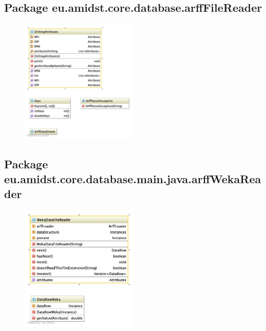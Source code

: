\subsection{Package eu.amidst.core.database.arffFileReader}

\begin{figure}[H]
  \centering
    \includegraphics[width=0.5\textwidth]{ClassDiagrams/core_database_filereaders_arfffilereader.jpg}
\end{figure}

\subsection{Package eu.amidst.core.database.main.java.arffWekaReader}
\begin{figure}[H]
  \centering
    \includegraphics[width=0.5\textwidth]{ClassDiagrams/core_database_filereaders_arffwekareader.jpg}
\end{figure}

